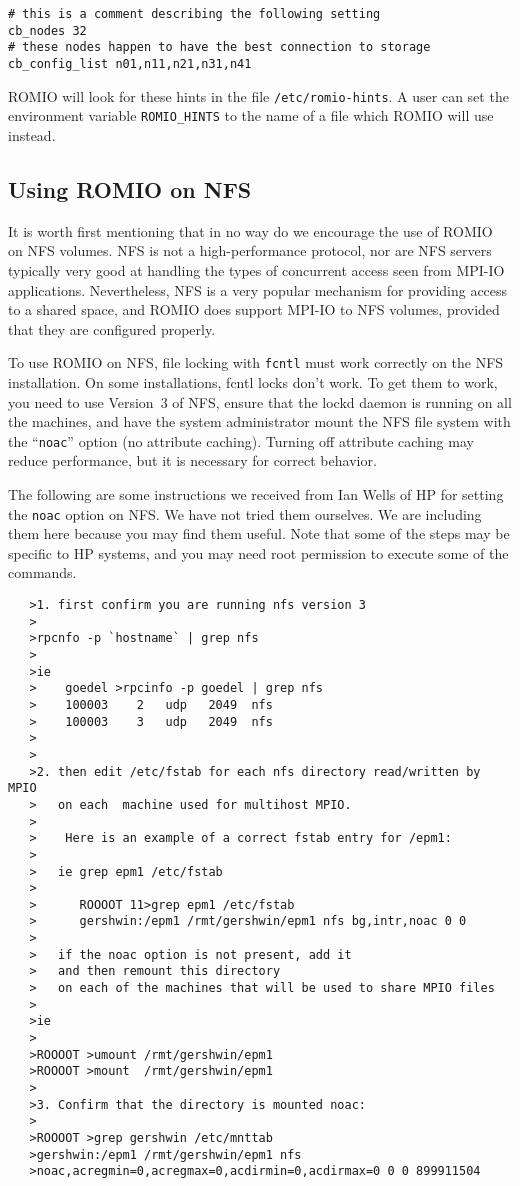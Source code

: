 \begin{verbatim}
# this is a comment describing the following setting
cb_nodes 32
# these nodes happen to have the best connection to storage
cb_config_list n01,n11,n21,n31,n41
\end{verbatim}

ROMIO will look for these hints in the file \texttt{/etc/romio-hints}.  A user
can set the environment variable \texttt{ROMIO\_HINTS} to the name of a file
which ROMIO will use instead.   

\subsection{Using ROMIO on NFS}

It is worth first mentioning that in no way do we encourage the use
of ROMIO on NFS volumes.  NFS is not a high-performance protocol, nor
are NFS servers typically very good at handling the types of concurrent
access seen from MPI-IO applications.  Nevertheless, NFS is a very popular
mechanism for providing access to a shared space, and ROMIO does support
MPI-IO to NFS volumes, provided that they are configured properly.

To use ROMIO on NFS, file locking with {\tt fcntl} must work correctly
on the NFS installation. On some installations, fcntl locks don't
work.  To get them to work, you need to use Version~3 of NFS, ensure
that the lockd daemon is running on all the machines, and have the system
administrator mount the NFS file system with the ``{\tt noac}'' option
(no attribute caching). Turning off attribute caching may reduce
performance, but it is necessary for correct behavior.

The following are some instructions we received from Ian Wells of HP
for setting the {\tt noac} option on NFS. We have not tried them
ourselves. We are including them here because you may find 
them useful. Note that some of the steps may be specific to HP
systems, and you may need root permission to execute some of the
commands. 

\begin{verbatim}   
   >1. first confirm you are running nfs version 3
   >
   >rpcnfo -p `hostname` | grep nfs
   >
   >ie 
   >    goedel >rpcinfo -p goedel | grep nfs
   >    100003    2   udp   2049  nfs
   >    100003    3   udp   2049  nfs
   >
   >
   >2. then edit /etc/fstab for each nfs directory read/written by MPIO
   >   on each  machine used for multihost MPIO.
   >
   >    Here is an example of a correct fstab entry for /epm1:
   >
   >   ie grep epm1 /etc/fstab
   > 
   >      ROOOOT 11>grep epm1 /etc/fstab
   >      gershwin:/epm1 /rmt/gershwin/epm1 nfs bg,intr,noac 0 0
   >
   >   if the noac option is not present, add it 
   >   and then remount this directory
   >   on each of the machines that will be used to share MPIO files
   >
   >ie
   >
   >ROOOOT >umount /rmt/gershwin/epm1
   >ROOOOT >mount  /rmt/gershwin/epm1
   >
   >3. Confirm that the directory is mounted noac:
   >
   >ROOOOT >grep gershwin /etc/mnttab 
   >gershwin:/epm1 /rmt/gershwin/epm1 nfs
   >noac,acregmin=0,acregmax=0,acdirmin=0,acdirmax=0 0 0 899911504
\end{verbatim}

